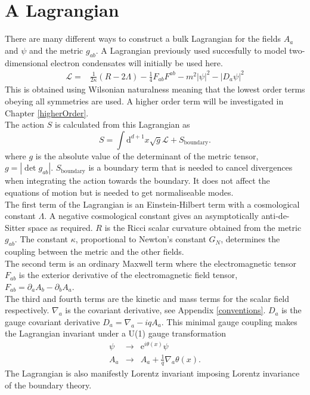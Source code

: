 \documentclass[12pt]{report}
\renewcommand{\d}{\ensuremath{\mathrm{d}}}
\renewcommand{\L}{\ensuremath{\mathcal{L}}}
\begin{document}
\section{A Lagrangian}
There are many different ways to construct a bulk Lagrangian for the fields $A_a$ and  $\psi$ and the metric $g_{ab}$. A Lagrangian previously used succesfully to model two-dimensional electron condensates \cite{hartnoll9, horowitz} will initially be used here.
\begin{eqnarray}
 \mathcal{L}=&\frac{1}{2\kappa}\left(R-2\Lambda\right)-\frac{1}{4}F_{ab}F^{ab}-m^2|\psi|^2-|D_a\psi|^2
\label{L}
\end{eqnarray}
This is obtained using Wilsonian naturalness meaning that the lowest order terms obeying all symmetries are used. A higher order term will be investigated in Chapter \ref{higherOrder}.\\

The action $S$ is calculated from this Lagrangian as
\begin{equation}
 S=\int\d^{d+1} x\sqrt{g}\L+S_\mathrm{boundary}.
\end{equation}
where $g$ is the absolute value of the determinant of the metric tensor, $g=|\det g_{ab}|$. $S_\mathrm{boundary}$ is a boundary term that is needed to cancel divergences when integrating the action towards the boundary. It does not affect the equations of motion but is needed to get normaliseable modes.\\

The first term of the Lagrangian is an Einstein-Hilbert term with a cosmological constant $\Lambda$. A negative cosmological constant gives an asymptotically anti-de-Sitter space as required. $R$ is the Ricci scalar curvature obtained from the metric $g_{ab}$. The constant $\kappa$, proportional to Newton's constant $G_N$, determines the coupling between the metric and the other fields.\\

The second term is an ordinary Maxwell term where the electromagnetic tensor $F_{ab}$ is the exterior derivative of the electromagnetic field tensor, $F_{ab}=\partial_aA_b-\partial_bA_a$.\\

The third and fourth terms are the kinetic and mass terms for the scalar field respectively. $\nabla_a$ is the covariant derivative, see Appendix \ref{conventions}. $D_a$ is the gauge covariant derivative $D_a=\nabla_a-iqA_a$. This minimal gauge coupling makes the Lagrangian invariant under a U(1) gauge transformation
\begin{eqnarray}
 \psi&\rightarrow&\mathrm{e}^{i\theta(x)}\psi\\
 A_a&\rightarrow& A_a+\frac{1}{q}\nabla_a\theta(x)\label{Agauge}.
\end{eqnarray}
The Lagrangian is also manifestly Lorentz invariant imposing Lorentz invariance of the boundary theory.
\end{document}
